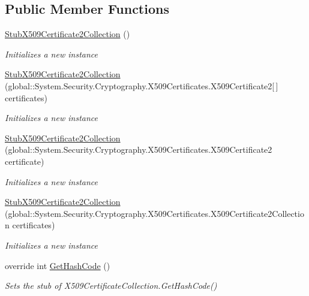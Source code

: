 \subsection*{Public Member Functions}
\begin{DoxyCompactItemize}
\item 
\hyperlink{class_system_1_1_security_1_1_cryptography_1_1_x509_certificates_1_1_fakes_1_1_stub_x509_certificate2_collection_aaf0deab26960765bb943309d0fb75b0f}{Stub\-X509\-Certificate2\-Collection} ()
\begin{DoxyCompactList}\small\item\em Initializes a new instance\end{DoxyCompactList}\item 
\hyperlink{class_system_1_1_security_1_1_cryptography_1_1_x509_certificates_1_1_fakes_1_1_stub_x509_certificate2_collection_a64154bf3e7a70f7e27f2ad456079b74d}{Stub\-X509\-Certificate2\-Collection} (global\-::\-System.\-Security.\-Cryptography.\-X509\-Certificates.\-X509\-Certificate2\mbox{[}$\,$\mbox{]} certificates)
\begin{DoxyCompactList}\small\item\em Initializes a new instance\end{DoxyCompactList}\item 
\hyperlink{class_system_1_1_security_1_1_cryptography_1_1_x509_certificates_1_1_fakes_1_1_stub_x509_certificate2_collection_a53c5ebb5a99a6c9e234083c961f456cc}{Stub\-X509\-Certificate2\-Collection} (global\-::\-System.\-Security.\-Cryptography.\-X509\-Certificates.\-X509\-Certificate2 certificate)
\begin{DoxyCompactList}\small\item\em Initializes a new instance\end{DoxyCompactList}\item 
\hyperlink{class_system_1_1_security_1_1_cryptography_1_1_x509_certificates_1_1_fakes_1_1_stub_x509_certificate2_collection_a4b1c976df7eebb63e0cb306455060414}{Stub\-X509\-Certificate2\-Collection} (global\-::\-System.\-Security.\-Cryptography.\-X509\-Certificates.\-X509\-Certificate2\-Collection certificates)
\begin{DoxyCompactList}\small\item\em Initializes a new instance\end{DoxyCompactList}\item 
override int \hyperlink{class_system_1_1_security_1_1_cryptography_1_1_x509_certificates_1_1_fakes_1_1_stub_x509_certificate2_collection_a81ee3b0368485e9beeb67ae8e4c3e198}{Get\-Hash\-Code} ()
\begin{DoxyCompactList}\small\item\em Sets the stub of X509\-Certificate\-Collection.\-Get\-Hash\-Code()\end{DoxyCompactList}\end{DoxyCompactItemize}
